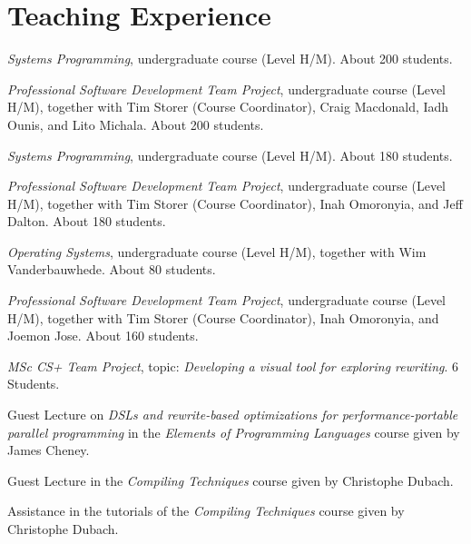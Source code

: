 \section{Teaching Experience}


\begin{cvitemize}[\small 2019 - 2020]
    \item \emph{Systems Programming}, undergraduate course (Level H/M). About 200 students.
    \item \emph{Professional Software Development Team Project}, undergraduate course (Level H/M), together with  Tim Storer (Course Coordinator), Craig Macdonald, Iadh Ounis, and Lito Michala. About 200 students.
\end{cvitemize}

\begin{cvitemize}[\small 2018 - 2019]
    \item \emph{Systems Programming}, undergraduate course (Level H/M). About 180 students.
    \item \emph{Professional Software Development Team Project}, undergraduate course (Level H/M), together with  Tim Storer (Course Coordinator), Inah Omoronyia, and Jeff Dalton. About 180 students.
\end{cvitemize}

\begin{cvitemize}[\small 2017 - 2018]
    \item \emph{Operating Systems}, undergraduate course (Level H/M), together with Wim Vanderbauwhede. About 80 students.
    \item \emph{Professional Software Development Team Project}, undergraduate course (Level H/M), together with  Tim Storer (Course Coordinator), Inah Omoronyia, and Joemon Jose. About 160 students.
    \item \emph{MSc CS+ Team Project}, topic: \emph{Developing a visual tool for exploring rewriting}. 6 Students.
\end{cvitemize}


\begin{cvitemize}[\small 2016 - 2017]
    \item Guest Lecture on \emph{\small DSLs and rewrite-based optimizations for performance-portable parallel programming} in the \emph{Elements of Programming Languages} course given by James Cheney.
    \item Guest Lecture in the \emph{Compiling Techniques} course given by Christophe Dubach.
    \item Assistance in the tutorials of the \emph{Compiling Techniques} course given by Christophe Dubach.
\end{cvitemize}

